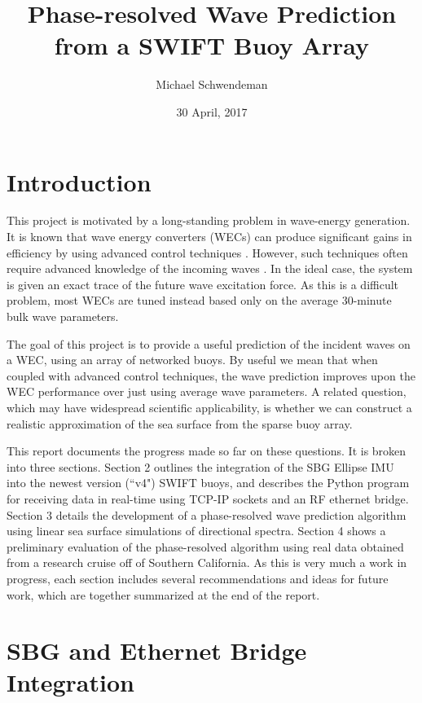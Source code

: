 \documentclass[11pt]{article}
\title{Phase-resolved Wave Prediction from a SWIFT Buoy Array}
\author{Michael Schwendeman}
\date{30 April, 2017}
\begin{document}
\maketitle
\section{Introduction}
This project is motivated by a long-standing problem in wave-energy generation.  It is known that wave energy converters (WECs) can produce significant gains in efficiency by using advanced control techniques \citep{Li:2012}.  However, such techniques often require advanced knowledge of the incoming waves \citep[see, for example,][]{Hals:2011}.  In the ideal case, the system is given an exact trace of the future wave excitation force.  As this is a difficult problem, most WECs are tuned instead based only on the average 30-minute bulk wave parameters. 

The goal of this project is to provide a useful prediction of the incident waves on a WEC, using an array of networked buoys.  By useful we mean that when coupled with advanced control techniques, the wave prediction improves upon the WEC performance over just using average wave parameters.
A related question, which may have widespread scientific applicability, is whether we can construct a realistic approximation of the sea surface from the sparse buoy array.

This report documents the progress made so far on these questions.  It is broken into three sections.  Section 2 outlines the integration of the SBG Ellipse IMU into the newest version (``v4") SWIFT buoys, and describes the Python program for receiving data in real-time using TCP-IP sockets and an RF ethernet bridge.  Section 3 details the development of a phase-resolved wave prediction algorithm using linear sea surface simulations of directional spectra.  Section 4 shows a preliminary evaluation of the phase-resolved algorithm using real data obtained from a research cruise off of Southern California.  As this is very much a work in progress, each section includes several recommendations and ideas for future work, which are together summarized at the end of the report.

\section{SBG and Ethernet Bridge Integration}
\end{document}
